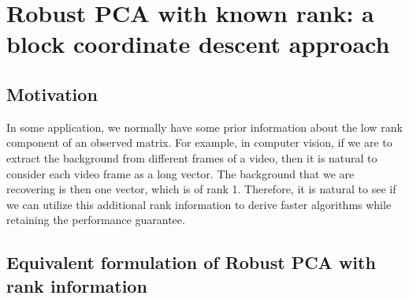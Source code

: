 \newpage
\section{Robust PCA with known rank: a block coordinate descent approach}

\subsection{Motivation}
In some application, we normally have some prior information about the low rank component of an observed matrix. For example, in computer vision, if we are to extract the background from different frames of a video, then it is natural to consider each video frame as a long vector. The background that we are recovering is then one vector, which is of rank 1. Therefore, it is natural to see if we can utilize this additional rank information to derive faster algorithms while retaining the performance guarantee.



\subsection{Equivalent formulation of Robust PCA with rank information}


